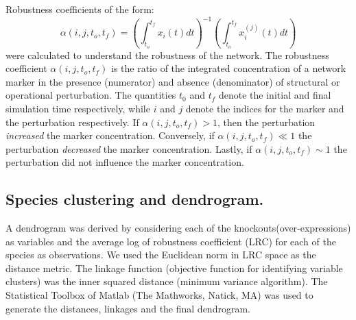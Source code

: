 \documentclass[fleqn,10pt]{wlscirep}
\begin{document}
Robustness coefficients of the form:
\begin{equation}
\alpha\left(i,j,t_{o},t_{f}\right)=\left(\displaystyle\int_{t_{o}}^{t_{f}}x_{i}\left(t\right)dt\right)^{-1}\left(\displaystyle\int_{t_{o}}^{t_{f}}x^{(j)}_{i}\left(t\right)dt\right)
\end{equation}
were calculated to understand the robustness of the network. 
The robustness coefficient $\alpha\left(i,j,t_{o},t_{f}\right)$ is the ratio of the integrated concentration of a network marker 
in the presence (numerator) and absence (denominator) of structural or operational perturbation.
The quantities $t_0$ and $t_f$ denote the initial and final simulation time respectively, while
$i$ and $j$ denote the indices for the marker and the perturbation respectively. 
If $\alpha\left(i,j,t_{o},t_{f}\right)>1$, then the perturbation \emph{increased} the marker concentration. Conversely,
if $\alpha\left(i,j,t_{o},t_{f}\right)\ll{1}$ the perturbation \emph{decreased} the marker concentration. Lastly, if
$\alpha\left(i,j,t_{o},t_{f}\right)\sim{1}$ the perturbation did not influence the marker concentration.

\subsection*{Species clustering and dendrogram.}
A dendrogram was derived by considering each of the knockouts(over-expressions) as variables and the average log of robustness coefficient (LRC) for each of the species as observations. We used the Euclidean norm in LRC space as the distance metric. The linkage function (objective function for identifying variable clusters) was the inner squared distance (minimum variance algorithm). The Statistical Toolbox of Matlab (The Mathworks, Natick, MA) was used to generate the distances, linkages and the final dendrogram. 
\end{document}
